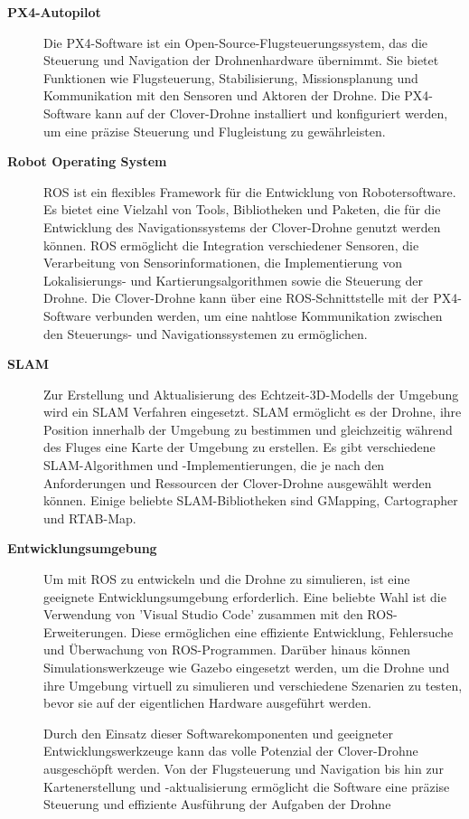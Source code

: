 \begin{description}
    \item[\textbf{PX4-Autopilot}] Die PX4-Software ist ein Open-Source-Flugsteuerungssystem, das die Steuerung und Navigation der Drohnenhardware übernimmt. Sie bietet Funktionen wie Flugsteuerung, Stabilisierung, Missionsplanung und Kommunikation mit den Sensoren und Aktoren der Drohne. Die PX4-Software kann auf der Clover-Drohne installiert und konfiguriert werden, um eine präzise Steuerung und Flugleistung zu gewährleisten.
    
    \item[\textbf{Robot Operating System}] ROS ist ein flexibles Framework für die Entwicklung von Robotersoftware. Es bietet eine Vielzahl von Tools, Bibliotheken und Paketen, die für die Entwicklung des Navigationssystems der Clover-Drohne genutzt werden können. ROS ermöglicht die Integration verschiedener Sensoren, die Verarbeitung von Sensorinformationen, die Implementierung von Lokalisierungs- und Kartierungsalgorithmen sowie die Steuerung der Drohne. Die Clover-Drohne kann über eine ROS-Schnittstelle mit der PX4-Software verbunden werden, um eine nahtlose Kommunikation zwischen den Steuerungs- und Navigationssystemen zu ermöglichen.
    \item[\textbf{\ac{SLAM}}] Zur Erstellung und Aktualisierung des Echtzeit-3D-Modells der Umgebung wird ein \ac{SLAM} Verfahren eingesetzt. \ac{SLAM} ermöglicht es der Drohne, ihre Position innerhalb der Umgebung zu bestimmen und gleichzeitig während des Fluges eine Karte der Umgebung zu erstellen. Es gibt verschiedene SLAM-Algorithmen und -Implementierungen, die je nach den Anforderungen und Ressourcen der Clover-Drohne ausgewählt werden können. Einige beliebte SLAM-Bibliotheken sind GMapping, Cartographer und RTAB-Map.
    
    \item[\textbf{Entwicklungsumgebung}]  Um mit ROS zu entwickeln und die Drohne zu simulieren, ist eine geeignete Entwicklungsumgebung erforderlich. Eine beliebte Wahl ist die Verwendung von 'Visual Studio Code' zusammen mit den ROS-Erweiterungen. Diese ermöglichen eine effiziente Entwicklung, Fehlersuche und Überwachung von ROS-Programmen. Darüber hinaus können Simulationswerkzeuge wie Gazebo eingesetzt werden, um die Drohne und ihre Umgebung virtuell zu simulieren und verschiedene Szenarien zu testen, bevor sie auf der eigentlichen Hardware ausgeführt werden.

    Durch den Einsatz dieser Softwarekomponenten und geeigneter Entwicklungswerkzeuge kann das volle Potenzial der Clover-Drohne ausgeschöpft werden. Von der Flugsteuerung und Navigation bis hin zur Kartenerstellung und -aktualisierung ermöglicht die Software eine präzise Steuerung und effiziente Ausführung der Aufgaben der Drohne
     
\end{description}

